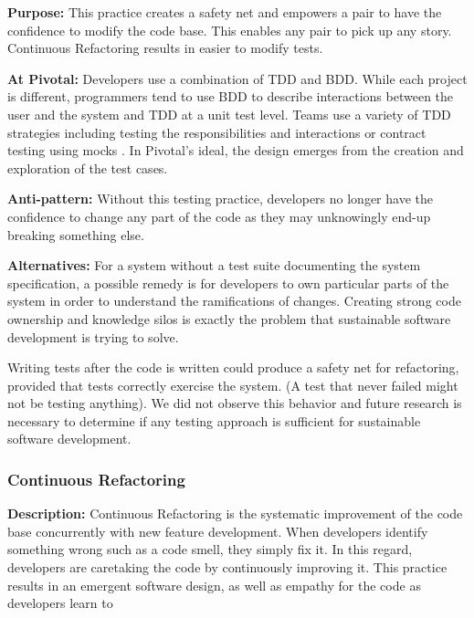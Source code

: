 \textbf{Purpose:} This practice creates a safety net and empowers a pair to have the confidence to modify the code base. This enables any pair to pick up any story. Continuous Refactoring results in easier to modify tests.

\textbf{At Pivotal:} Developers use a combination of TDD and BDD. While each project is different, programmers tend to use BDD to describe interactions between the user and the system and TDD at a unit test level. Teams use a variety of TDD strategies including testing the responsibilities and interactions \cite{Goose} or contract testing using mocks \cite{RainsbergerIntegrationTestsYouTube}. In Pivotal’s ideal, the design emerges from the creation and exploration of the test cases. 

\textbf{Anti-pattern:} Without this testing practice, developers no longer have the confidence to change any part of the code as they may unknowingly end-up breaking something else. 

\textbf{Alternatives:} For a system without a test suite documenting the system specification, a possible remedy is for developers to own particular parts of the system in order to understand the ramifications of changes. Creating strong code ownership and knowledge silos is exactly the problem that sustainable software development is trying to solve.

Writing tests after the code is written could produce a safety net for refactoring, provided that tests correctly exercise the system. (A test that never failed might not be testing anything). We did not observe this behavior and future research is necessary to determine if any testing approach is sufficient for sustainable software development.

\subsubsection{Continuous Refactoring}
\textbf{Description:} Continuous Refactoring is the systematic improvement of the code base concurrently with new feature development. When developers identify something wrong such as a code smell, they simply fix it. In this regard, developers are caretaking the code by continuously improving it. This practice results in an emergent software design, as well as empathy for the code as developers learn to  


